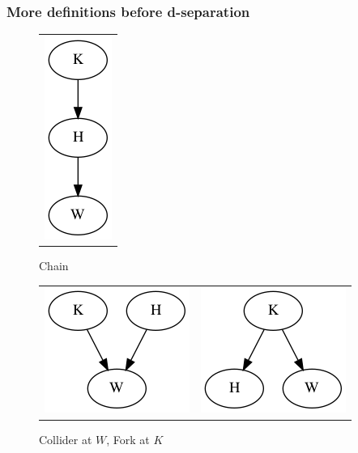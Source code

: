 \begin{frame}
\frametitle{More definitions before d-separation}

\begin{figure}[ht]
  \begin{tabular}{c}
    \includegraphics[height=0.35\textheight]{graphics/karma_chain}
  \end{tabular}
  \caption{Chain}
  \begin{tabular}{cc}
    \includegraphics[height=0.35\textheight]{graphics/karma_collider}      
    &
    \includegraphics[height=0.35\textheight]{graphics/karma_fork}
  \end{tabular}
\caption{Collider at $W$, Fork at $K$}
\end{figure}

\end{frame}


